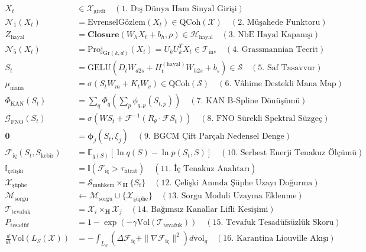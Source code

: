 \documentclass[11pt, a4paper]{article}
\begin{document}
\begin{align}
X_t &\in \mathcal{X}_{\text{girdi}} \quad (\text{1. Dış Dünya Ham Sinyal Girişi}) \\
\mathcal{N}_1(X_t) &= \text{EvrenselGözlem}(X_t) \in \text{QCoh}(\mathcal{X}) \quad (\text{2. Müşahede Funktoru}) \\
Z_{\text{hayal}} &= \mathbf{Closure}(W_h X_t + b_h, \rho) \in \mathcal{H}_{\text{hayal}} \quad (\text{3. NbE Hayal Kapanışı}) \\
\mathcal{N}_5(X_t) &= \text{Proj}_{\text{Gr}(k,d)}(X_t) = U_k U_k^T X_t \in \mathcal{T}_{\text{inv}} \quad (\text{4. Grassmannian Tecrit}) \\
S_t &= \text{GELU}(D_t W_{d2s} + H_t^{(\text{hayal})} W_{h2s} + b_s) \in \mathcal{S} \quad (\text{5. Saf Tasavvur}) \\
\mu_{\text{mana}} &= \sigma(S_t W_m + K_t W_v) \in \text{QCoh}(\mathcal{S}) \quad (\text{6. Vâhime Destekli Mana Map}) \\
\Phi_{\text{KAN}}(S_t) &= \sum_q \Phi_q \left( \sum_p \phi_{q,p}(S_{t, p}) \right) \quad (\text{7. KAN B-Spline Dönüşümü}) \\
\mathcal{G}_{\text{FNO}}(S_t) &= \sigma\left( W S_t + \mathcal{F}^{-1}(R_\theta \cdot \mathcal{F} S_t) \right) \quad (\text{8. FNO Sürekli Spektral Süzgeç}) \\
\mathbf{0} &= \bm{\phi}_j(S_t, \xi_j) \quad (\text{9. BGCM Çift Parçalı Nedensel Denge}) \\
\mathcal{F}_{\text{iç}}(S_t, S_{\text{kebîr}}) &= \mathbb{E}_{q(S)} [\ln q(S) - \ln p(S_t, S)] \quad (\text{10. Serbest Enerji Tenakuz Ölçümü}) \\
\mathbb{I}_{\text{çelişki}} &= \mathbb{I}(\mathcal{F}_{\text{iç}} > \tau_{\text{fıtrat}}) \quad (\text{11. İç Tenakuz Anahtarı}) \\
\mathcal{X}_{\text{şüphe}} &= \mathcal{S}_{\text{muhkem}} \times_{\mathbf{H}} \{S_t\} \quad (\text{12. Çelişki Anında Şüphe Uzayı Doğurma}) \\
\mathcal{M}_{\text{sorgu}} &\leftarrow \mathcal{M}_{\text{sorgu}} \cup \{\mathcal{X}_{\text{şüphe}}\} \quad (\text{13. Sorgu Moduli Uzayına Eklenme}) \\
\mathcal{T}_{\text{tevafuk}} &= \mathcal{X}_i \times_{\mathbf{H}} \mathcal{X}_j \quad (\text{14. Bağımsız Kanallar Lifli Kesişimi}) \\
P_{\text{tesadüf}} &= 1 - \exp(-\gamma \text{Vol}(\mathcal{T}_{\text{tevafuk}})) \quad (\text{15. Tevafuk Tesadüfsüzlük Skoru}) \\
\frac{d}{dt}\text{Vol}(L_S(\mathcal{X})) &= -\int_{L_S} (\Delta \mathcal{F}_{\text{iç}} + \|\nabla \mathcal{F}_{\text{iç}}\|^2) d\text{vol}_g \quad (\text{16. Karantina Liouville Akışı}) \\

\end{align}
\end{document}
